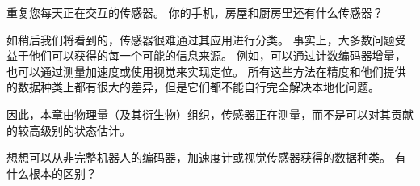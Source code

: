 \begin{framed}

重复您每天正在交互的传感器。 你的手机，房屋和厨房里还有什么传感器？
\end{framed}




如稍后我们将看到的，传感器很难通过其应用进行分类。 事实上，大多数问题受益于他们可以获得的每一个可能的信息来源。 例如，可以通过计数编码器增量，也可以通过测量加速度或使用视觉来实现定位。 所有这些方法在精度和他们提供的数据种类上都有很大的差异，但是它们都不能自行完全解决本地化问题。

因此，本章由物理量（及其衍生物）组织，传感器正在测量，而不是可以对其贡献的较高级别的状态估计。

\begin{framed}

想想可以从非完整机器人的编码器，加速度计或视觉传感器获得的数据种类。 有什么根本的区别？
\end{framed}


